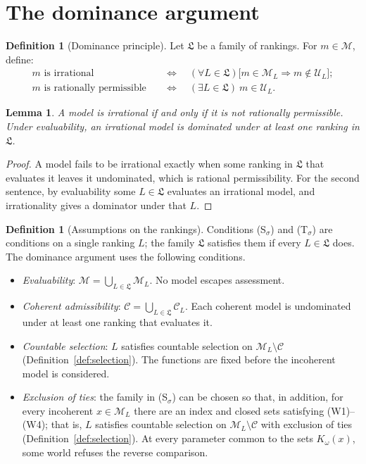 \documentclass[11pt]{article}
\newtheorem{lemma}[theorem]{Lemma}
\theoremstyle{definition}
\newtheorem{definition}[theorem]{Definition}
\theoremstyle{remark}
\newcommand{\M}{\mathcal M}
\newcommand{\C}{\mathcal C}
\newcommand{\U}{\mathcal U}
\newcommand{\Lf}{\mathfrak L}
\begin{document}
\section{The dominance argument}\label{sec:conclusion}

\begin{definition}[Dominance principle]\label{def:permissibility}
Let $\Lf$ be a family of rankings. For $m\in\M$, define:
\begin{align*}
m\text{ is irrational}&\quad\Longleftrightarrow\quad (\forall L\in\Lf)\bigl[m\in\M_L\Rightarrow m\notin\U_L\bigr];\\
m\text{ is rationally permissible}&\quad\Longleftrightarrow\quad (\exists L\in\Lf)\ m\in\U_L.
\end{align*}
\end{definition}

\begin{lemma}\label{lem:complement}
A model is irrational if and only if it is not rationally permissible. Under evaluability, an irrational model is dominated under at least one ranking in $\Lf$.
\end{lemma}
\begin{proof}
A model fails to be irrational exactly when some ranking in $\Lf$ that evaluates it leaves it undominated, which is rational permissibility. For the second sentence, by evaluability some $L\in\Lf$ evaluates an irrational model, and irrationality gives a dominator under that $L$.
\end{proof}

\begin{definition}[Assumptions on the rankings]\label{def:argument-assumptions}
Conditions (S$_\sigma$) and (T$_\sigma$) are conditions on a single ranking $L$; the family $\Lf$ satisfies them if every $L\in\Lf$ does. The dominance argument uses the following conditions.
\begin{itemize}[leftmargin=3.4em,labelsep=0.5em]
\item[\textbf{(E)}] \emph{Evaluability}: $\M=\bigcup_{L\in\Lf}\M_L$. No model escapes assessment.
\item[\textbf{(A)}] \emph{Coherent admissibility}: $\C=\bigcup_{L\in\Lf}\C_L$. Each coherent model is undominated under at least one ranking that evaluates it.
\item[\textbf{(S$_\sigma$)}] \emph{Countable selection}: $L$ satisfies countable selection on $\M_L\setminus\C$ (Definition~\ref{def:selection}). The functions are fixed before the incoherent model is considered.
\item[\textbf{(T$_\sigma$)}] \emph{Exclusion of ties}: the family in (S$_\sigma$) can be chosen so that, in addition, for every incoherent $x\in\M_L$ there are an index and closed sets satisfying (W1)--(W4); that is, $L$ satisfies countable selection on $\M_L\setminus\C$ with exclusion of ties (Definition~\ref{def:selection}). At every parameter common to the sets $K_\omega(x)$, some world refuses the reverse comparison.
\end{itemize}
\end{definition}
\end{document}
